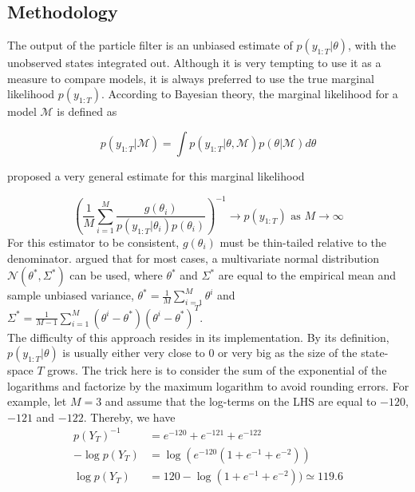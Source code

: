 \documentclass[11pt,a4,twosided,singlespacing,titlepagenumber=on]{scrreprt}
\numberwithin{equation}{chapter} %
\theoremstyle{remark}
\begin{document}
\subsection{Methodology}

The output of the particle filter is an unbiased estimate of $p(y_{1:T}|\theta)$, with the unobserved states integrated out. Although it is very tempting to use it as a measure to compare models, it is always preferred to use the true marginal likelihood $p(y_{1:T})$. According to Bayesian theory, the marginal likelihood for a model $\mathcal{M}$ is defined as

\begin{equation}
p(y_{1:T} | \mathcal{M}) = \int p(y_{1:T} | \theta, \mathcal{M}) p(\theta | \mathcal{M}) d\theta
\end{equation}


\cite{gelfand1994} proposed a very general estimate for this marginal likelihood

\begin{equation}
\left(\frac{1}{M} \sum_{i=1}^M \frac{g(\theta_i)}{p(y_{1:T} | \theta_i) p(\theta_i)}\right)^{-1} \rightarrow p(y_{1:T}) \text{ as } M \rightarrow \infty
\end{equation}
For this estimator to be consistent, $g(\theta_i)$ must be thin-tailed relative to the denominator. \cite{gelfand1994} argued that for most cases, a multivariate normal distribution $\mathcal{N}(\theta^*, \Sigma^*)$ can be used, where $\theta^*$ and $\Sigma^*$ are equal to the empirical mean and sample unbiased variance, $\theta^* = \frac{1}{M} \sum_{i=1}^M \theta^i$ and $\Sigma^* = \frac{1}{M-1} \sum_{i=1}^M \left(\theta^i - \theta^*\right)\left(\theta^i - \theta^*\right)^T$. \\


The difficulty of this approach resides in its implementation. By its definition, $p(y_{1:T} | \theta)$ is usually either very close to 0 or very big as the size of the state-space $T$ grows. The trick here is to consider the sum of the exponential of the logarithms and factorize by the maximum logarithm to avoid rounding errors. For example, let $M = 3$ and assume that the log-terms on the LHS are equal to $-120$, $-121$ and $-122$. Thereby, we have
\begin{align*}
p(Y_T)^{-1} &= e^{-120} + e^{-121} + e^{-122} \\
- \log p(Y_T) &= \log (e^{-120} ( 1 + e^{-1} + e^{-2})) \\
 \log p(Y_T) &= 120 - \log ( 1 + e^{-1} + e^{-2})) \simeq 119.6
\end{align*}
\end{document}
